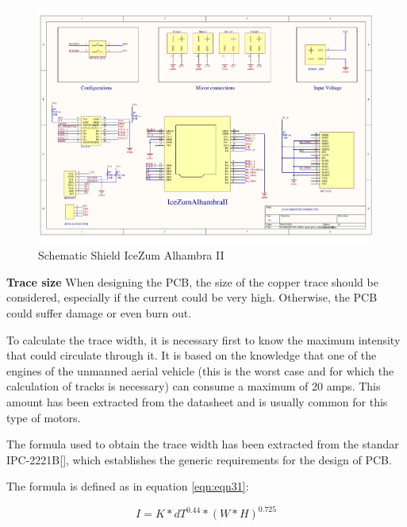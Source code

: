 \begin{center}
	\begin{figure}[H]
		\center
		\includegraphics[scale=0.6, angle=90]{imagenes/Balancing_Robot/pcb_dron_schematic.pdf}
		\caption{Schematic Shield IceZum Alhambra II}
		\label{fig:schematics_tfg}
	\end{figure}
\end{center}
\newpage

\textbf{Trace size} \newline
When designing the PCB, the size of the copper trace should be considered, especially if the current could be very high. Otherwise, the PCB could suffer damage or even burn out. \newline

To calculate the trace width, it is necessary first to know the maximum intensity that could circulate through it. It is based on the knowledge that one of the engines of the unmanned aerial vehicle (this is the worst case and for which the calculation of tracks is necessary) can consume a maximum of 20 amps. This amount has been extracted from the datasheet and is usually common for this type of motors. \newline

The formula used to obtain the trace width has been extracted from the standar IPC-2221B[], which establishes the generic requirements for the design of PCB.\newline

The formula is defined as in equation \ref{eqn:eqn31}: 

\begin{equation}
I = K * dT^{0.44}*(W*H)^{0.725}
\label{eqn:eqn31}
\end{equation}

